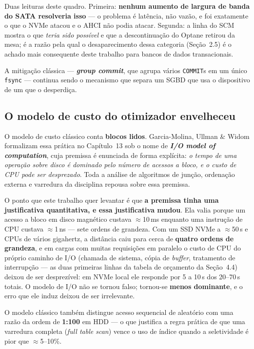 \documentclass[11pt,a4paper]{article}
\begin{document}
Duas leituras deste quadro. Primeira: \textbf{nenhum aumento de largura de banda do SATA
resolveria isso} --- o problema é latência, não vazão, e foi exatamente o que o NVMe atacou
e o AHCI não podia atacar. Segunda: a linha do SCM mostra o que \emph{teria sido possível}
e que a descontinuação do Optane retirou da mesa; é a razão pela qual o desaparecimento
dessa categoria (Seção~2.5) é o achado mais consequente deste trabalho para bancos de dados
transacionais.

A mitigação clássica --- \textbf{\emph{group commit}}, que agrupa vários \texttt{COMMIT}s em
um único \texttt{fsync} --- continua sendo o mecanismo que separa um SGBD que usa o
dispositivo de um que o desperdiça.

\subsection{O modelo de custo do otimizador envelheceu}

O modelo de custo clássico conta \textbf{blocos lidos}. Garcia-Molina, Ullman \& Widom
formalizam essa prática no Capítulo~13 sob o nome de \textbf{\emph{I/O model of
computation}}, cuja premissa é enunciada de forma explícita: \emph{o tempo de uma operação
sobre disco é dominado pelo número de acessos a bloco, e o custo de CPU pode ser
desprezado}. Toda a análise de algoritmos de junção, ordenação externa e varredura da
disciplina repousa sobre essa premissa.

O ponto que este trabalho quer levantar é que \textbf{a premissa tinha uma justificativa
quantitativa, e essa justificativa mudou}. Ela valia porque um acesso a bloco em disco
magnético custava $\approx$10\,ms enquanto uma instrução de CPU custava $\approx$1\,ns ---
sete ordens de grandeza. Com um SSD NVMe a $\approx$50\,\textmu s e CPUs de vários
gigahertz, a distância caiu para cerca de \textbf{quatro ordens de grandeza}, e em cargas
com muitas requisições em paralelo o custo de CPU do próprio caminho de I/O (chamada de
sistema, cópia de \emph{buffer}, tratamento de interrupção --- as duas primeiras linhas da
tabela de orçamento da Seção~4.4) deixou de ser desprezível: em NVMe local ele responde por
5 a 10\,\textmu s dos 20--70\,\textmu s totais. O modelo de I/O não se tornou falso; tornou-se
\textbf{menos dominante}, e o erro que ele induz deixou de ser irrelevante.

O modelo clássico também distingue acesso sequencial de aleatório com uma razão da ordem de
\textbf{1:100} em HDD --- o que justifica a regra prática de que uma varredura completa
(\emph{full table scan}) vence o uso de índice quando a seletividade é pior que
$\approx$5--10\%.
\end{document}
